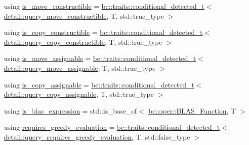 \begin{DoxyCompactItemize}
\item 
using \hyperlink{structbc_1_1tensors_1_1exprs_1_1expression__traits_a79f84851dcb50d4b56daa25301a3f9fb}{is\+\_\+move\+\_\+constructible} = \hyperlink{namespacebc_1_1traits_a1a6d378947ec32acd457890854bcd592}{bc\+::traits\+::conditional\+\_\+detected\+\_\+t}$<$ \hyperlink{namespacebc_1_1tensors_1_1exprs_1_1detail_a19fd04baa3f6d8fcce66c01e51b7399d}{detail\+::query\+\_\+move\+\_\+constructible}, T, std\+::true\+\_\+type $>$
\item 
using \hyperlink{structbc_1_1tensors_1_1exprs_1_1expression__traits_a1d26ea54c18b367ffb22646e46ad2872}{is\+\_\+copy\+\_\+constructible} = \hyperlink{namespacebc_1_1traits_a1a6d378947ec32acd457890854bcd592}{bc\+::traits\+::conditional\+\_\+detected\+\_\+t}$<$ \hyperlink{namespacebc_1_1tensors_1_1exprs_1_1detail_abac935bf36b4924c73532023e11f75c2}{detail\+::query\+\_\+copy\+\_\+constructible}, T, std\+::true\+\_\+type $>$
\item 
using \hyperlink{structbc_1_1tensors_1_1exprs_1_1expression__traits_ae32e2d333f9a7eed4baee44455cf7b46}{is\+\_\+move\+\_\+assignable} = \hyperlink{namespacebc_1_1traits_a1a6d378947ec32acd457890854bcd592}{bc\+::traits\+::conditional\+\_\+detected\+\_\+t}$<$ \hyperlink{namespacebc_1_1tensors_1_1exprs_1_1detail_ac325e0e2cef5518953db86853d9780fc}{detail\+::query\+\_\+move\+\_\+assignable}, T, std\+::true\+\_\+type $>$
\item 
using \hyperlink{structbc_1_1tensors_1_1exprs_1_1expression__traits_ae5b90ffbe5ee242543685ac0905d8aec}{is\+\_\+copy\+\_\+assignable} = \hyperlink{namespacebc_1_1traits_a1a6d378947ec32acd457890854bcd592}{bc\+::traits\+::conditional\+\_\+detected\+\_\+t}$<$ \hyperlink{namespacebc_1_1tensors_1_1exprs_1_1detail_a48ce13185316802e0ca8ad8cee7d5870}{detail\+::query\+\_\+copy\+\_\+assignable}, T, std\+::true\+\_\+type $>$
\item 
using \hyperlink{structbc_1_1tensors_1_1exprs_1_1expression__traits_a09c158f1e3caf8a09be668795c294aed}{is\+\_\+blas\+\_\+expression} = std\+::is\+\_\+base\+\_\+of$<$ \hyperlink{structbc_1_1oper_1_1BLAS__Function}{bc\+::oper\+::\+B\+L\+A\+S\+\_\+\+Function}, T $>$
\item 
using \hyperlink{structbc_1_1tensors_1_1exprs_1_1expression__traits_a0e96f494a14aad16cc6c65195fa325a6}{requires\+\_\+greedy\+\_\+evaluation} = \hyperlink{namespacebc_1_1traits_a1a6d378947ec32acd457890854bcd592}{bc\+::traits\+::conditional\+\_\+detected\+\_\+t}$<$ \hyperlink{namespacebc_1_1tensors_1_1exprs_1_1detail_a0e9b0b3486b5ec529b2c622f14b688f9}{detail\+::query\+\_\+requires\+\_\+greedy\+\_\+evaluation}, T, std\+::false\+\_\+type $>$

\end{DoxyCompactItemize}
